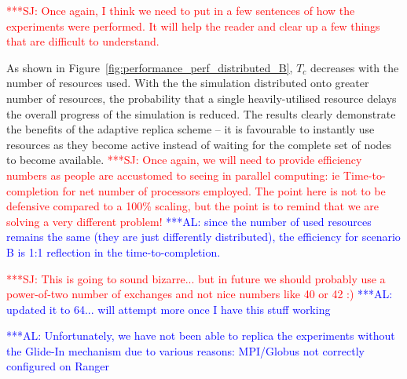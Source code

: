 \documentclass{rspublic}
\newcommand{\alnote}[1]{ {\textcolor{blue} { ***AL: #1 }}}
\newcommand{\jhanote}[1]{ {\textcolor{red} { ***SJ: #1 }}}
\newcommand{\alnote}[1]{}
\newcommand{\jhanote}[1]{}
\begin{document}
\jhanote{Once again, I think we need to put in a few sentences of how
  the experiments were performed. It will help the reader and clear up
  a few things that are difficult to understand.}

As shown in Figure~\ref{fig:performance_perf_distributed_B}, $T_{c}$
decreases with the number of resources used.  With the the simulation
distributed onto greater number of resources, the probability that a
single heavily-utilised resource delays the overall progress of the
simulation is reduced.
The results clearly demonstrate the benefits of the adaptive replica
scheme -- it is favourable to instantly use resources as they become
active instead of waiting for the complete set of nodes to become
available.  \jhanote{Once again, we will need to provide efficiency
  numbers as people are accustomed to seeing in parallel computing: ie
  Time-to-completion for net number of processors employed.  The point
  here is not to be defensive compared to a 100\% scaling, but the
  point is to remind that we are solving a very different problem!}
\alnote{since the number of used resources remains the same (they are
  just differently distributed), the efficiency for scenario B is 1:1
  reflection in the time-to-completion.}

\jhanote{This is going to sound bizarre... but in future we should
  probably use a power-of-two number of exchanges and not nice numbers
  like 40 or 42 :)}           
\alnote{updated it to 64... will attempt more once I have this stuff working}

                                              
\alnote{Unfortunately, we have not been able to replica the
  experiments without the Glide-In mechanism due to various reasons:
  MPI/Globus not correctly configured on Ranger}
\end{document}

